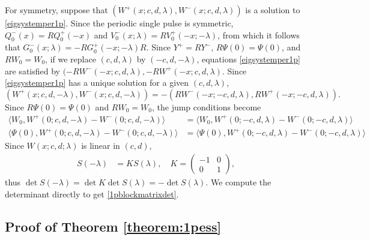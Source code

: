 \documentclass[10pt,reqno]{amsart}
\theoremstyle{plain}
\theoremstyle{definition}
\theoremstyle{remark}
\numberwithin{theorem}{section}
\numberwithin{equation}{section}
\begin{document}
For symmetry, suppose that $(W^+(x; c, d, \lambda), W^-(x; c, d, \lambda))$ is a solution to \cref{eigsystemper1p}. Since the periodic single pulse is symmetric, $Q_0^-(x) = R Q_0^+(-x)$ and $V_0^-(x; \lambda) = R V_0^+(-x; -\lambda)$, from which it follows that $G_0^-(x; \lambda) = -R G_0^+(-x; -\lambda)R$. Since $Y^+ = R Y^-$, $R \Psi(0) = \Psi(0)$, and $R W_0 = W_0$, if we replace $(c, d, \lambda)$ by $(-c, d, -\lambda)$, equations \cref{eigsystemper1p} are satisfied by $(-RW^-(-x; c, d, \lambda), -RW^+(-x; c, d, \lambda)$. Since \cref{eigsystemper1p} has a unique solution for a given $(c, d, \lambda)$, 
\[
\left(W^+(x; c, d, -\lambda), W^-(x; c, d, -\lambda)\right)
= -\left(RW^-(-x; -c, d, \lambda), RW^+(-x; -c, d, \lambda)\right).
\]
Since $R \Psi(0) = \Psi(0)$ and $R W_0 = W_0$, the jump conditions become
\begin{align*}
\langle W_0, W^+(0; c, d, -\lambda) - W^-(0; c, d, -\lambda) \rangle &= \langle W_0, W^+(0; -c, d, \lambda) - W^-(0; -c, d, \lambda) \rangle \\
\langle \Psi(0), W^+(0; c, d, -\lambda) - W^-(0; c, d, -\lambda) \rangle &= \langle \Psi(0), W^+(0; -c, d, \lambda) - W^-(0; -c, d, \lambda) \rangle 
\end{align*}
Since $W(x; c, d; \lambda)$ is linear in $(c, d)$,
\begin{align*}
S(-\lambda) &= K S(\lambda), \quad K = \begin{pmatrix}-1 & 0 \\ 0 & 1 \end{pmatrix},
\end{align*}
thus $\det S(-\lambda) = \det K \det S(\lambda) = -\det S(\lambda)$. We compute the determinant directly to get \cref{1pblockmatrixdet}.

\subsection{Proof of Theorem \ref{theorem:1pess} }
\end{document}
